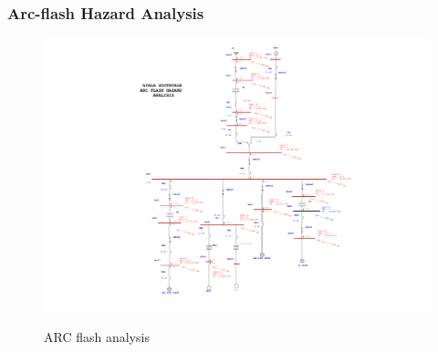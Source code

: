 \subsubsection{Arc-flash Hazard Analysis }
\begin{figure}
	\includegraphics[width=\textwidth]{figures/fig_ch04_elecaudit_Arc_Flash_Analysis.pdf} \\
	\caption{ARC flash analysis}
	\label{fig_ch04_elecaudit_ARC1_SLD_Arc_Flash_Analysis}
\end{figure}


